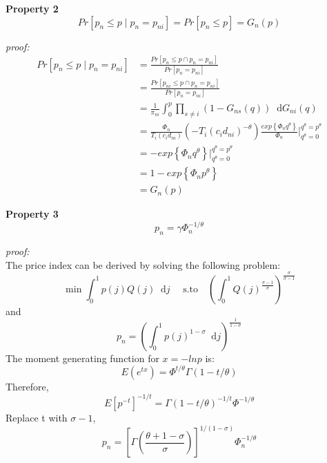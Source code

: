 \documentclass{article}
\newcommand*\diff{\mathop{}\!\mathrm{d}}
\begin{document}
\textbf{Property 2}
$$Pr\left[p_n \leq p \mid p_n = p_{ni}\right] = Pr[p_n \leq p ] = G_n(p)$$

\textit{proof: }\\
\begin{equation*}
    \begin{split}
        Pr\left[p_n \leq p \mid p_n = p_{ni}\right]&=\frac{Pr[p_n \leq p \cap p_n = p_{ni}]}{Pr[p_n = p_{ni}]}\\
        &=\frac{Pr[p_{ni} \leq p \cap p_n = p_{ni}]}{Pr[p_n = p_{ni}]}\\
        &=\frac{1}{\pi_{ni}}\int_0^p \prod_{s\neq i}(1-G_{ns}(q))\diff G_{ni}(q)\\
        &= \frac{\Phi_n}{T_i (c_i d_{ni})}\left(-T_i (c_i d_{ni})^{-\theta}\right) \frac{exp\left\{  \Phi_n q^\theta  \right\}}{\Phi_n} \Big|_{q^\theta = 0}^{q^\theta = p^\theta} \\
        &=  -exp\left\{  \Phi_n q^\theta  \right\}\Big|_{q^\theta = 0}^{q^\theta = p^\theta}\\
        &= 1-exp\left\{  \Phi_n p^\theta  \right\}\\
        &= G_n(p)
    \end{split}
\end{equation*}


\textbf{Property 3}
$$p_n = \gamma\Phi_n^{-1/\theta}$$

\textit{proof: }\\
The price index can be derived by solving the following problem:
$$\min \int_0^1 p(j)Q(j) \diff j \text{~~~~s.to~~~}\left( \int_0^1 Q(j)^{\frac{\sigma-1}{\sigma}} \right)^{\frac{\sigma}{\sigma-1}}$$
and $$p_n =\left( \int_0^1 p(j)^{1-\sigma}\diff j\right)^{\frac{1}{1-\sigma}}$$
The moment generating function for $x = -lnp$ is:
$$E(e^{tx}) = \Phi^{t/\theta}\Gamma (1 - t/\theta)$$
Therefore,
$$E[p^{-t}]^{-1/t}=\Gamma(1-t/\theta)^{-1/t}\Phi^{-1/\theta}$$
Replace t with $\sigma -1$,
$$p_n = \left[ \Gamma \left(    \frac{\theta+1-\sigma}{\sigma} \right) \right]^{1/(1-\sigma)} \Phi_n^{-1/\theta}$$
\end{document}
